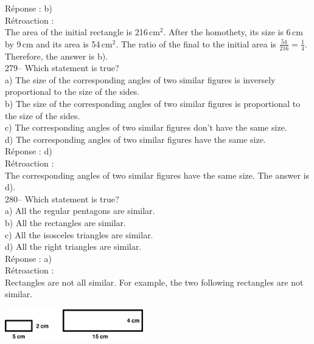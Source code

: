 \documentclass[letterpaper, 12pt]{article}
\begin{document}
R\'eponse : b)\\

R\'etroaction : \\
The area of the initial rectangle is 216\,cm$^{2}$.  After the
homothety, its size is 6\,cm by 9\,cm and its area is 54\,cm$^{2}$.
The ratio of the final to the initial area is
$\frac{54}{216}=\frac{1}{4}.$  Therefore, the answer is b).\\

279-- Which statement is true?\\

a) The size of the corresponding angles of two similar figures is
inversely proportional to the size of the sides.\\
b) The size of the corresponding angles of two similar figures is
proportional to the size of the sides.\\
c) The corresponding angles of two similar figures don't have the same size.\\
d) The corresponding angles of two similar figures have the same size.\\

R\'eponse : d)\\

R\'etroaction : \\
The corresponding angles of two similar figures have the same size.
The answer is d).\\

280-- Which statement is true?\\

a) All the regular pentagons are similar.\\
b) All the rectangles are similar.\\
c) All the isosceles triangles are similar.\\
d) All the right triangles are similar.\\

R\'eponse : a)\\

R\'etroaction : \\
Rectangles are not all similar. For example, the two following
rectangles are not similar.\\
    \begin{center}
    \includegraphics[width=6cm]{rectanglesemblable1.eps}
    \end{center}
\end{document}
